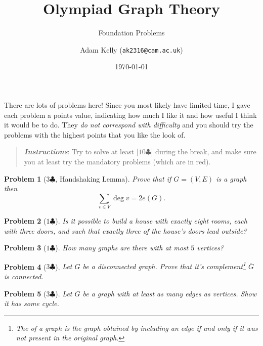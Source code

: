 \documentclass[a4paper]{scrartcl}
\title{Olympiad Graph Theory}
\subtitle{Foundation Problems}
\author{Adam Kelly (\texttt{ak2316@cam.ac.uk})}
\date{\today}
\newcommand{\score}[1]{{\color{blue}$#1\clubsuit$}}
\newcommand{\scoremandatory}[1]{{\color{red}$#1\clubsuit$}}
\newtheorem{prob}{Problem}
\begin{document}
\maketitle


There are lots of problems here! Since you most likely have limited time, I gave each problem a points value, indicating how much I like it and how useful I think it would be to do.
They \emph{do not correspond with difficulty} and you should try the problems with the highest points that you like the look of.

\begin{quote}
	\textbf{\emph{Instructions}}: Try to solve at least {\color{blue}[$10\clubsuit$]} during the break, and make sure you at least try the mandatory problems (which are in {\color{red} red}).
\end{quote}

\vspace*{2\baselineskip}

\begin{prob}[\scoremandatory{3}, Handshaking Lemma]
Prove that if $G = (V, E)$ is a graph then
$$
\sum_{v \in V} \deg v = 2e(G).
$$
\end{prob}

\begin{prob}[\score{1}]
	Is it possible to build a house with exactly eight rooms, each with three doors, and such that exactly three of the house's doors lead outside?
\end{prob}

\begin{prob}[\score{1}]
How many graphs are there with at most $5$ vertices?
\end{prob}
	


\begin{prob}[\score{3}]
Let $G$ be a disconnected graph. Prove that it's complement\footnote{The  of a graph is the graph obtained by including an edge if and only if it was not present in the original graph.} $\overline{G}$ is connected.
\end{prob}

\begin{prob}[\score{3}]
Let $G$ be a graph with at least as many edges as vertices. Show it has some cycle.
\end{prob}
\end{document}
